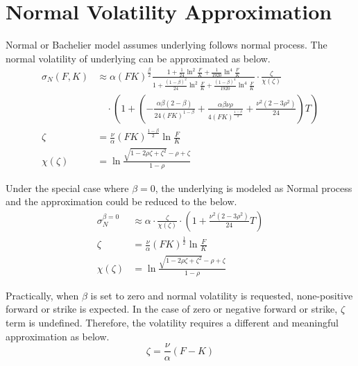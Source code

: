 \documentclass{article}
\begin{document}
\section{Normal Volatility Approximation}

Normal or Bachelier model assumes underlying follows normal process.
The normal volatility of underlying can be approximated as below.
\begin{subequations}
    \begin{align}
        \sigma_N{(F, K)} &\approx \alpha {\left(F K\right)}^{\frac{\beta}{2}} \frac{1 + \frac{1}{24} \ln^2{\frac{F}{K}} + \frac{1}{1920} \ln^4{\frac{F}{K}}}{1 + \frac{\left(1 - \beta\right)^{2}}{24} \ln^2{\frac{F}{K}} + \frac{\left(1 - \beta\right)^{4}}{1920} \ln^4{\frac{F}{K}}} \cdot \frac{\zeta}{\chi \left(\zeta\right)}\nonumber \\
        & \quad \cdot \left(1 + \left(-\frac{\alpha \beta (2 - \beta)}{24 {\left(F K\right)}^{1 - \beta}} + \frac{\alpha \beta \nu \rho}{4 {\left(F K\right)}^{\frac{1 - \beta}{2}}} + \frac{\nu^2 \left(2 - 3 \rho^2\right)}{24}\right) T \right)\\
        \zeta &= \frac{\nu}{\alpha} {(F K)}^{\frac{1 - \beta}{2}} \ln{\frac{F}{K}} \\
        \chi(\zeta) &= \ln{\frac{\sqrt{1 - 2 \rho \zeta + {\zeta}^2} - \rho + \zeta}{1 - \rho}}
    \end{align}
\end{subequations}

Under the special case where $ \beta = 0 $, the underlying is modeled as Normal process and the approximation could be reduced to the below.
\begin{subequations}
    \begin{align}
        \sigma_N^{\beta=0} &\approx \alpha \cdot \frac{\zeta}{\chi(\zeta)} \cdot \left(1 + \frac{\nu^2 \left(2 - 3 \rho^2\right)}{24} T \right) \\
        \zeta &= \frac{\nu}{\alpha} (F K)^{\frac{1}{2}} \ln{\frac{F}{K}} \\
        \chi(\zeta) &= \ln{\frac{\sqrt{1 - 2 \rho \zeta + \zeta^2} - \rho + \zeta}{1 - \rho}}
    \end{align}
\end{subequations}

Practically, when $ \beta $ is set to zero and normal volatility is requested, none-positive forward or strike is expected.
In the case of zero or negative forward or strike, $ \zeta $ term is undefined.
Therefore, the volatility requires a different and meaningful approximation as below.
\begin{equation}
    \zeta = \frac{\nu}{\alpha} \left(F - K\right)
\end{equation}
\end{document}
